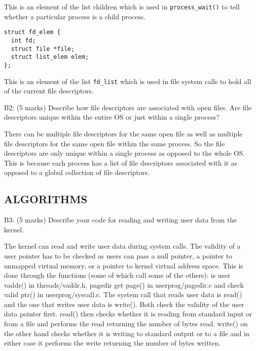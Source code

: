This is an element of the list children which is used in \texttt{process\_wait()} to tell whether a particular process is a child process.

\begin{verbatim}
struct fd_elem {
  int fd;
  struct file *file;
  struct list_elem elem;
};
\end{verbatim}

This is an element of the list \texttt{fd\_list} which is used in file system calls to hold all of the current file descriptors.




\noindent B2: (5 marks)
Describe how file descriptors are associated with open files.
Are file descriptors unique within the entire OS or just within a
single process?


There can be multiple file descriptors for the same open file as well as multiple file descriptors for the same open file within the same process. So the file descriptors are only unique within a single process as opposed to the whole OS. This is because each process has a list of file descriptors associated with it as opposed to a global collection of file descriptors.


\subsection*{ALGORITHMS}

\noindent B3: (5 marks)
Describe your code for reading and writing user data from the
kernel.


The kernel can read and write user data during system calls. The validity of a user pointer has to be checked as users can pass a null pointer, a pointer to unmapped virtual memory, or a pointer to kernel virtual address space. This is done through the functions (some of which call some of the others): is user vaddr() in threads/vaddr.h, pagedir get page() in userprog/pagedir.c and check valid ptr() in userprog/syscall.c. The system call that reads user data is read() and the one that writes user data is write(). Both check the validity of the user data pointer first. read() then checks whether it is reading from standard input or from a file and performs the read returning the number of bytes read. write() on the other hand checks whether it is writing to standard output or to a file and in either case it performs the write returning the number of bytes written.

